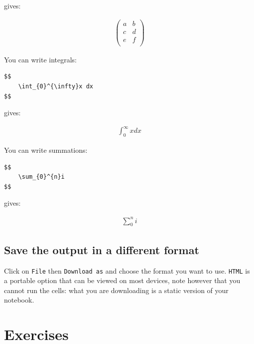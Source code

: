 gives:

\begin{equation*}
\begin{split}
    \begin{pmatrix}
        a&b\\
        c&d\\
        e&f\\
    \end{pmatrix}
\end{split}
\end{equation*}

You can write integrals:

\begin{verbatim}
$$
    \int_{0}^{\infty}x dx
$$
\end{verbatim}


gives:

\begin{equation*}
\begin{split}
    \int_{0}^{\infty}x dx
\end{split}
\end{equation*}

You can write summations:

\begin{verbatim}
$$
    \sum_{0}^{n}i
$$
\end{verbatim}


gives:

\begin{equation*}
\begin{split}
    \sum_{0}^{n}i
\end{split}
\end{equation*}

\subsection{Save the output in a different format}

Click on \texttt{File} then \texttt{Download as} and choose the format you want
to use. \texttt{HTML}
is a portable option that can be viewed on most devices, note however that you
cannot run the cells: what you are downloading is a static version of your
notebook.

\section{Exercises}

